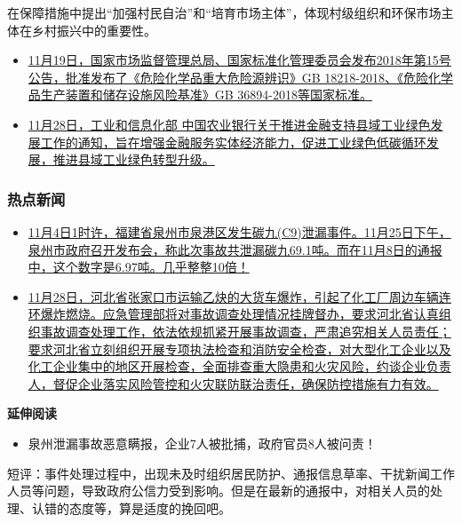 \documentclass[
]{book}
\providecommand{\tightlist}{%
  \setlength{\itemsep}{0pt}\setlength{\parskip}{0pt}}
\begin{document}
在保障措施中提出``加强村民自治''和``培育市场主体''，体现村级组织和环保市场主体在乡村振兴中的重要性。

\begin{itemize}
\item
  \href{http://std.sacinfo.org.cn/gnoc/queryInfo?id=5B346CFFC8BAFE6C2261363A85D93492}{11月19日，国家市场监督管理总局、国家标准化管理委员会发布2018年第15号公告，批准发布了《危险化学品重大危险源辨识》GB 18218-2018、《危险化学品生产装置和储存设施风险基准》GB 36894-2018等国家标准。}
\item
  \href{http://www.miit.gov.cn/n1146285/n1146352/n3054355/n3057542/n3057544/c6514554/content.html}{11月28日，工业和信息化部 中国农业银行关于推进金融支持县域工业绿色发展工作的通知，旨在增强金融服务实体经济能力，促进工业绿色低碳循环发展，推进县域工业绿色转型升级。}
\end{itemize}

\hypertarget{ux70edux70b9ux65b0ux95fb}{%
\subsubsection*{热点新闻}\label{ux70edux70b9ux65b0ux95fb}}

\begin{itemize}
\item
  \href{http://www.fujian.gov.cn/xw/zfgzdt/sxdt/qz/201811/t20181126_4682855.htm}{11月4日1时许，福建省泉州市泉港区发生碳九(C9)泄漏事件。11月25日下午，泉州市政府召开发布会，称此次事故共泄漏碳九69.1吨。而在11月8日的通报中，这个数字是6.97吨。几乎整整10倍！}
\item
  \href{http://www.chinasafety.gov.cn/xw/bbgz/201811/t20181130_222820.shtml}{11月28日，河北省张家口市运输乙炔的大货车爆炸，引起了化工厂周边车辆连环爆炸燃烧。应急管理部将对事故调查处理情况挂牌督办，要求河北省认真组织事故调查处理工作，依法依规抓紧开展事故调查，严肃追究相关人员责任；要求河北省立刻组织开展专项执法检查和消防安全检查，对大型化工企业以及化工企业集中的地区开展检查，全面排查重大隐患和火灾风险，约谈企业负责人，督促企业落实风险管控和火灾联防联治责任，确保防控措施有力有效。}
\end{itemize}

\textbf{延伸阅读}

\begin{itemize}
\tightlist
\item
  泉州泄漏事故恶意瞒报，企业7人被批捕，政府官员8人被问责！
\end{itemize}

短评：事件处理过程中，出现未及时组织居民防护、通报信息草率、干扰新闻工作人员等问题，导致政府公信力受到影响。但是在最新的通报中，对相关人员的处理、认错的态度等，算是适度的挽回吧。
\end{document}
